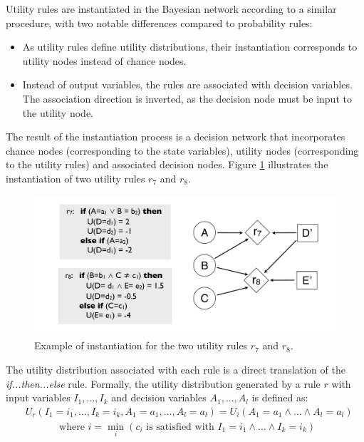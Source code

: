 Utility rules are instantiated in the Bayesian network according to a similar procedure, with two notable differences compared to probability rules: \begin{itemize}
\item As utility rules define utility distributions, their instantiation corresponds to utility nodes instead of chance nodes.
\item Instead of output variables, the rules are associated with decision variables.  The association direction is inverted, as the decision node must be input to the utility node.
\end{itemize} 

The result of the instantiation process is a decision network that incorporates chance nodes (corresponding to the state variables), utility nodes (corresponding to the utility rules) and associated decision nodes. Figure \ref{fig:instantitionutil} illustrates the instantiation of two utility rules $r_7$ and $r_8$. 

\begin{figure}[h]
\centering
\includegraphics[scale=0.25]{imgs/ruleinstantiation2.pdf}
\caption{Example of instantiation for the two utility rules $r_7$ and $r_8$.}
\label{fig:instantitionutil}
\end{figure}


The utility distribution associated with each rule is a direct translation of the  \textit{if...then...else} rule.  Formally, the utility distribution generated by a rule $r$ with input variables $I_1, \dots, I_k$ and decision variables $A_1, \dots, A_l$ is defined as:
\begin{align}
& U_r(I_1\!=\!i_1, \dots, I_k\!=\!i_k, A_1\!=\!a_1, \dots, A_l\!=\!a_l) = U_i(A_1\!=\!a_1 \land \dots \land A_l\!=\!a_l) \label{eq:utildistrib}\\
&  \; \; \; \; \; \; \; \;  \; \; \; \text{ where } i = \min_i (c_i \text{ is satisfied with } I_1\!=\!i_1 \land \dots \land I_k\!=\!i_k) \nonumber
\end{align}


